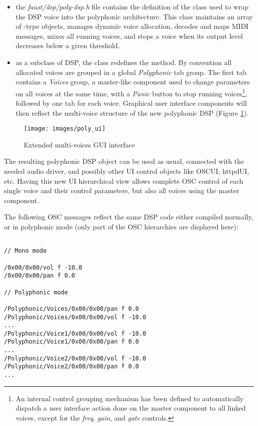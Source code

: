 \begin{itemize}

\item  the {\it faust/dsp/poly-dsp.h} file contains the definition of the  class used to wrap the DSP voice into the polyphonic architecture. This class maintains an array of -type objects, manages dynamic voice allocation, decodes and maps MIDI messages, mixes all running voices, and stops a voice when its output level decreases below a given threshold.

\item as a subclass of DSP, the   class redefines the  method. By convention all allocated voices are grouped in a global  {\it Polyphonic} tab group. The first tab contains a {\it Voices} group, a master-like component used to change parameters on all voices at the same time, with a {\it Panic} button to stop running voices\footnote{An internal control grouping mechanism has been defined to automatically dispatch a user interface action done on the master component to all linked voices, except for the  {\it freq}, {\it gain}, and {\it gate} controls.}, followed by one tab for each voice. Graphical user interface components will then reflect the multi-voice structure of the new polyphonic DSP (Figure \ref{fig:poly-ui}). 

 \end{itemize}
 
\begin{figure}[!ht]
\begin{center}
\texttt{[image: images/poly\_ui]}
\caption{\footnotesize Extended multi-voices GUI interface}
\label{fig:poly-ui}
\end{center}
\end{figure}

The resulting polyphonic DSP object can be used as usual, connected with the needed audio driver, and possibly other UI control objects like OSCUI, httpdUI, etc. Having this new UI hierarchical view allows complete OSC control of each single voice and their control parameters, but also all voices using the master component. 

The following OSC messages reflect the same DSP code either compiled normally,  or in polyphonic mode (only part of the OSC hierarchies are displayed here):

\footnotesize
\begin{lstlisting}

// Mono mode

/0x00/0x00/vol f -10.0
/0x00/0x00/pan f 0.0

// Polyphonic mode

/Polyphonic/Voices/0x00/0x00/pan f 0.0
/Polyphonic/Voices/0x00/0x00/vol f -10.0
...
/Polyphonic/Voice1/0x00/0x00/vol f -10.0
/Polyphonic/Voice1/0x00/0x00/pan f 0.0
...
/Polyphonic/Voice2/0x00/0x00/vol f -10.0
/Polyphonic/Voice2/0x00/0x00/pan f 0.0
...
\end{lstlisting}
\normalsize

